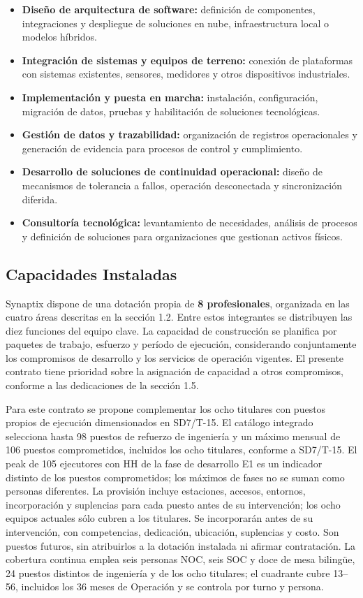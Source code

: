 \begin{itemize}
    \item \textbf{Diseño de arquitectura de software:} definición de componentes, integraciones y despliegue de soluciones en nube, infraestructura local o modelos híbridos.
    \item \textbf{Integración de sistemas y equipos de terreno:} conexión de plataformas con sistemas existentes, sensores, medidores y otros dispositivos industriales.
    \item \textbf{Implementación y puesta en marcha:} instalación, configuración, migración de datos, pruebas y habilitación de soluciones tecnológicas.
    \item \textbf{Gestión de datos y trazabilidad:} organización de registros operacionales y generación de evidencia para procesos de control y cumplimiento.
    \item \textbf{Desarrollo de soluciones de continuidad operacional:} diseño de mecanismos de tolerancia a fallos, operación desconectada y sincronización diferida.
    \item \textbf{Consultoría tecnológica:} levantamiento de necesidades, análisis de procesos y definición de soluciones para organizaciones que gestionan activos físicos.
\end{itemize}

\subsection{Capacidades Instaladas}

Synaptix dispone de una dotación propia de \textbf{8 profesionales}, organizada en las cuatro áreas descritas en la sección 1.2. Entre estos integrantes se distribuyen las diez funciones del equipo clave. La capacidad de construcción se planifica por paquetes de trabajo, esfuerzo y período de ejecución, considerando conjuntamente los compromisos de desarrollo y los servicios de operación vigentes. El presente contrato tiene prioridad sobre la asignación de capacidad a otros compromisos, conforme a las dedicaciones de la sección 1.5.

Para este contrato se propone complementar los ocho titulares con puestos propios de ejecución dimensionados en SD7/T-15. El catálogo integrado selecciona hasta 98 puestos de refuerzo de ingeniería y un máximo mensual de 106 puestos comprometidos, incluidos los ocho titulares, conforme a SD7/T-15. El peak de 105 ejecutores con HH de la fase de desarrollo E1 es un indicador distinto de los puestos comprometidos; los máximos de fases no se suman como personas diferentes. La provisión incluye estaciones, accesos, entornos, incorporación y suplencias para cada puesto antes de su intervención; los ocho equipos actuales sólo cubren a los titulares. Se incorporarán antes de su intervención, con competencias, dedicación, ubicación, suplencias y costo. Son puestos futuros, sin atribuirlos a la dotación instalada ni afirmar contratación. La cobertura continua emplea seis personas NOC, seis SOC y doce de mesa bilingüe, 24 puestos distintos de ingeniería y de los ocho titulares; el cuadrante cubre 13--56, incluidos los 36 meses de Operación y se controla por turno y persona.

